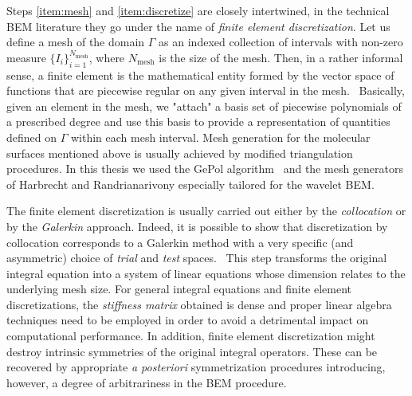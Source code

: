 Steps \ref{item:mesh} and \ref{item:discretize} are closely intertwined,
in the technical \acrshort{BEM} literature they go under the name of
\emph{finite element discretization}.
Let us define a mesh of the domain $\Gamma$ as an indexed collection of
intervals with non-zero measure $\lbrace I_i\rbrace_{i=1}^{N_\mathrm{mesh}}$, where
$N_\mathrm{mesh}$ is the size of the mesh.
Then, in a rather informal sense, a finite element is the
mathematical entity formed by the vector space of functions that are
piecewise regular on any given interval in the mesh.~\autocite{Ern2004-oo}
Basically, given an element in the mesh, we "attach" a basis set of
piecewise polynomials of a prescribed degree and use this basis to
provide a representation of quantities defined on $\Gamma$ within each
mesh interval.
Mesh generation for the molecular surfaces mentioned above is usually
achieved by modified triangulation procedures. In this thesis we used
the GePol algorithm~\autocite{Pascual-Ahuir1987-uo, Pascual-Ahuir1990-lp,
Pomelli1998-qp, Pomelli2001-sj, Frediani2004-ua, Pomelli2007-wq}
and the mesh generators of Harbrecht and Randrianarivony especially
tailored for the wavelet \acrshort{BEM}.~\autocite{Harbrecht2009-no,
Harbrecht2011-dk}

The finite element discretization is usually carried out either by the
\emph{collocation} or by the \emph{Galerkin} approach.
Indeed, it is possible to show that discretization by collocation
corresponds to a Galerkin method with a very specific (and asymmetric)
choice of \emph{trial} and \emph{test}
spaces.~\autocite{Hackbusch1995-uq, Ern2004-oo}
This step transforms the original integral equation into a system of
linear equations whose dimension relates to the underlying mesh size.
For general integral equations and finite element discretizations,
the \emph{stiffness matrix} obtained is dense and proper linear algebra
techniques need to be employed in order to avoid a detrimental impact on
computational performance.
In addition, finite element discretization might destroy intrinsic
symmetries of the original integral
operators. These can be recovered by appropriate \emph{a posteriori}
symmetrization procedures introducing, however, a degree of
arbitrariness in the \acrshort{BEM} procedure.~\autocite{Lange2011-eu}

